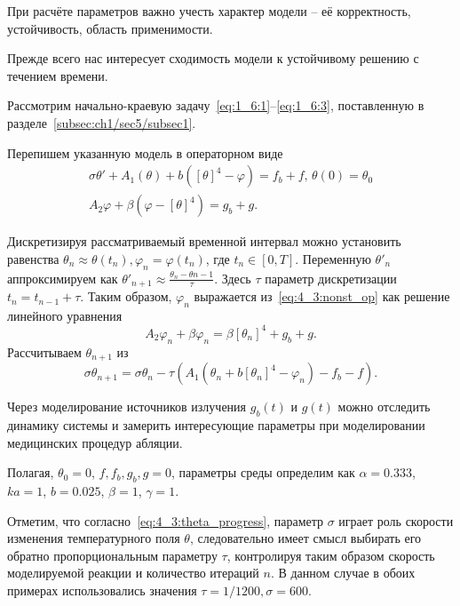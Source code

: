 При расчёте параметров важно учесть характер модели -- её корректность, устойчивость,
область применимости.

Прежде всего нас интересует сходимость модели к устойчивому решению с течением времени.

Рассмотрим начально-краевую задачу~\eqref{eq:1_6:1}--\eqref{eq:1_6:3},
поставленную в разделе~\ref{subsec:ch1/sec5/subsec1}.

Перепишем указанную модель в операторном виде
\begin{equation}
    \label{eq:4_3:nonst_op}
    \begin{gathered}
        \sigma \theta' + A_1(\theta) + b([\theta]^4 - \varphi) = f_b + f, \, \theta(0) = \theta_0 \\
        A_2\varphi + \beta(\varphi - [\theta]^4) = g_b + g.
    \end{gathered}
\end{equation}

Дискретизируя рассматриваемый временной интервал можно установить равенства
$\theta_n \approx \theta(t_n), \varphi_n = \varphi(t_n)$, где $t_n \in [0, T]$.
Переменную $\theta'_n$ аппроксимируем как $\theta'_{n+1} \approx \frac{\theta_{n} - \theta{n-1}}{\tau}$.
Здесь $\tau$ параметр дискретизации $t_n = t_{n-1} + \tau$.
Таким образом, $\varphi_n$ выражается из~\eqref{eq:4_3:nonst_op} как решение линейного уравнения
\[
    A_2 \varphi_n + \beta \varphi_n = \beta [\theta_n]^4 + g_b + g.
\]
Рассчитываем $\theta_{n+1}$ из
\begin{equation}
    \label{eq:4_3:theta_progress}
    \sigma \theta_{n+1} = \sigma \theta_n - \tau (A_1(\theta_n + b[\theta_n]^4 - \varphi_n) - f_b -f).
\end{equation}

Через моделирование источников излучения $g_b(t)$ и $g(t)$ можно отследить динамику системы и замерить
интересующие параметры при моделировании медицинских процедур абляции.

Полагая, $\theta_0 = 0$, $f, f_b, g_b, g = 0$, параметры среды определим как
$\alpha = 0.333$,
$ka = 1$,
$b = 0.025$,
$\beta = 1$,
$\gamma = 1$.

Отметим, что согласно~\eqref{eq:4_3:theta_progress},
параметр $\sigma$ играет роль скорости изменения температурного поля $\theta$, следовательно
имеет смысл выбирать его обратно пропорциональным параметру $\tau$,
контролируя таким образом скорость моделируемой реакции и количество итераций $n$.
В данном случае в обоих примерах использовались значения $\tau = 1/1200, \sigma = 600$.

